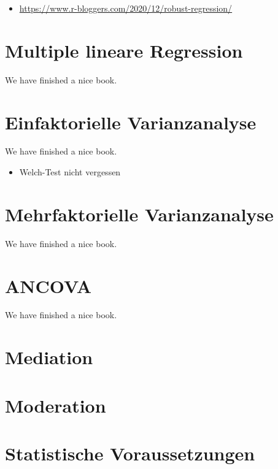 \documentclass[
]{book}
\providecommand{\tightlist}{%
  \setlength{\itemsep}{0pt}\setlength{\parskip}{0pt}}
\begin{document}
\begin{itemize}
\tightlist
\item
  \url{https://www.r-bloggers.com/2020/12/robust-regression/}
\end{itemize}

\hypertarget{multiple-lineare-regression}{%
\chapter{Multiple lineare Regression}\label{multiple-lineare-regression}}

We have finished a nice book.

\hypertarget{einfaktorielle-varianzanalyse}{%
\chapter{Einfaktorielle Varianzanalyse}\label{einfaktorielle-varianzanalyse}}

We have finished a nice book.

\begin{itemize}
\tightlist
\item
  Welch-Test nicht vergessen
\end{itemize}

\hypertarget{mehrfaktorielle-varianzanalyse}{%
\chapter{Mehrfaktorielle Varianzanalyse}\label{mehrfaktorielle-varianzanalyse}}

We have finished a nice book.

\hypertarget{ancova}{%
\chapter{ANCOVA}\label{ancova}}

We have finished a nice book.

\hypertarget{mediation}{%
\chapter{Mediation}\label{mediation}}

\hypertarget{moderation}{%
\chapter{Moderation}\label{moderation}}

\hypertarget{statistische-voraussetzungen}{%
\chapter{Statistische Voraussetzungen}\label{statistische-voraussetzungen}}
\end{document}
